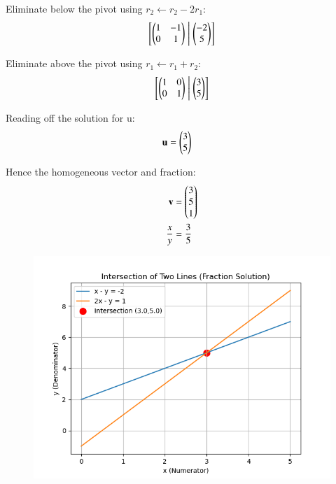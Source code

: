 \documentclass[journal]{IEEEtran}
\begin{document}
Eliminate below the pivot using 
\(r_2 \leftarrow r_2 - 2 r_1\):
\begin{align}
\left[\begin{pmatrix}1 & -1 \\ 0 & 1\end{pmatrix} \;\middle|\; \begin{pmatrix}-2 \\ 5\end{pmatrix}\right]
\end{align}


Eliminate above the pivot using 
\(r_1 \leftarrow r_1 + r_2\):
\begin{align}
\left[\begin{pmatrix}1 & 0 \\ 0 & 1\end{pmatrix} \;\middle|\; \begin{pmatrix}3 \\ 5\end{pmatrix}\right]
\end{align}



Reading off the solution for u:
\begin{align}
\mathbf{u} &= \begin{pmatrix}3 \\ 5\end{pmatrix}
\end{align}

Hence the homogeneous vector and fraction:
\begin{align}
\mathbf{v} &= \begin{pmatrix}3 \\ 5 \\ 1\end{pmatrix} \\
\frac{x}{y} &= \frac{3}{5}
\end{align}


\begin{figure}[H]
    \centering
    \includegraphics[width=0.5\columnwidth]{figs/fig1.png}
    \caption{}
    \label{fig:placeholder}
\end{figure}
\end{document}
